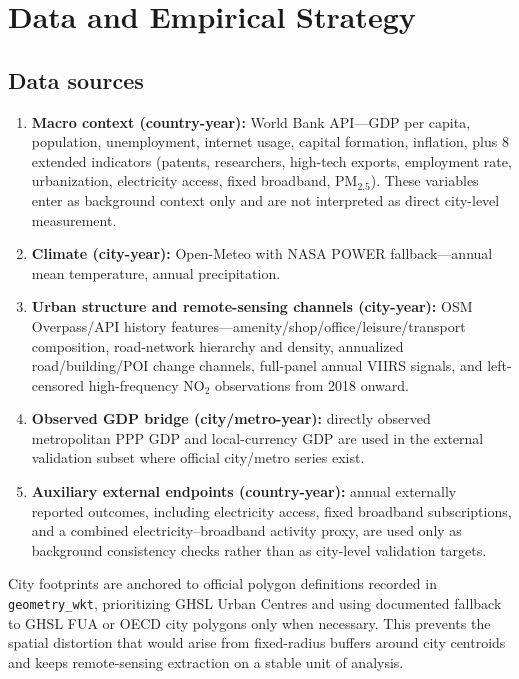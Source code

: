 \documentclass[11pt,a4paper]{article}
\begin{document}
\section{Data and Empirical Strategy}
\label{sec:data}

\subsection{Data sources}
\begin{enumerate}[label=(\roman*)]
  \item \textbf{Macro context (country-year):} World Bank API---GDP per capita, population, unemployment, internet usage, capital formation, inflation, plus 8 extended indicators (patents, researchers, high-tech exports, employment rate, urbanization, electricity access, fixed broadband, PM$_{2.5}$). These variables enter as background context only and are not interpreted as direct city-level measurement.
  \item \textbf{Climate (city-year):} Open-Meteo with NASA POWER fallback---annual mean temperature, annual precipitation.
  \item \textbf{Urban structure and remote-sensing channels (city-year):} OSM Overpass/API history features---amenity/shop/office/leisure/transport composition, road-network hierarchy and density, annualized road/building/POI change channels, full-panel annual VIIRS signals, and left-censored high-frequency NO$_2$ observations from 2018 onward.
  \item \textbf{Observed GDP bridge (city/metro-year):} directly observed metropolitan PPP GDP and local-currency GDP are used in the external validation subset where official city/metro series exist.
  \item \textbf{Auxiliary external endpoints (country-year):} annual externally reported outcomes, including electricity access, fixed broadband subscriptions, and a combined electricity--broadband activity proxy, are used only as background consistency checks rather than as city-level validation targets.
\end{enumerate}

City footprints are anchored to official polygon definitions recorded in \texttt{geometry\_wkt}, prioritizing GHSL Urban Centres and using documented fallback to GHSL FUA or OECD city polygons only when necessary.
This prevents the spatial distortion that would arise from fixed-radius buffers around city centroids and keeps remote-sensing extraction on a stable unit of analysis.
\end{document}

